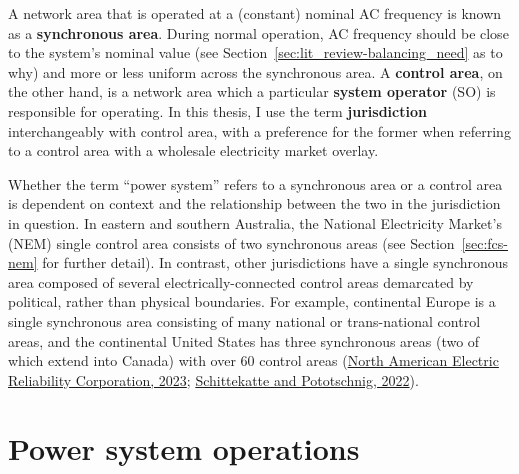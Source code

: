 \documentclass[12pt,a4paper,]{report}
\begin{document}
A network area that is operated at a (constant) nominal AC frequency is
known as a \textbf{synchronous area}. During normal operation, AC
frequency should be close to the system's nominal value (see
Section~\ref{sec:lit_review-balancing_need} as to why) and more or less
uniform across the synchronous area. A \textbf{control area}, on the
other hand, is a network area which a particular \textbf{system
operator} (SO) is responsible for operating. In this thesis, I use the
term \textbf{jurisdiction} interchangeably with control area, with a
preference for the former when referring to a control area with a
wholesale electricity market overlay.

Whether the term ``power system'' refers to a synchronous area or a
control area is dependent on context and the relationship between the
two in the jurisdiction in question. In eastern and southern Australia,
the National Electricity Market's (NEM) single control area consists of
two synchronous areas (see Section~\ref{sec:fcs-nem} for further
detail). In contrast, other jurisdictions have a single synchronous area
composed of several electrically-connected control areas demarcated by
political, rather than physical boundaries. For example, continental
Europe is a single synchronous area consisting of many national or
trans-national control areas, and the continental United States has
three synchronous areas (two of which extend into Canada) with over 60
control areas
(\protect\hyperlink{ref-northamericanelectricreliabilitycorporationNERCInterconnections2023}{North
American Electric Reliability Corporation, 2023};
\protect\hyperlink{ref-schittekatteDistributedEnergyResources2022}{Schittekatte
and Pototschnig, 2022}).

\hypertarget{sec:lit_review-operations}{%
\section{Power system operations}\label{sec:lit_review-operations}}
\end{document}
